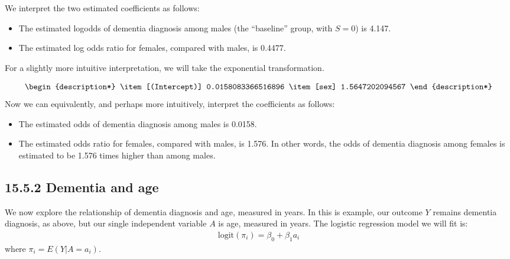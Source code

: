 \documentclass[letterpaper,10pt,english]{jupyterBook}
\begin{document}
\sphinxAtStartPar
We interpret the two estimated coefficients as follows:
\begin{itemize}
\item {} 
\sphinxAtStartPar
The estimated log\sphinxhyphen{}odds of dementia diagnosis among males (the “baseline” group, with \(S=0\)) is \sphinxhyphen{}4.147.

\item {} 
\sphinxAtStartPar
The estimated log odds ratio for females, compared with males, is 0.4477.

\end{itemize}

\sphinxAtStartPar
For a slightly more intuitive interpretation, we will take the exponential transformation.

\begin{sphinxVerbatim}[commandchars=\\\{\}]
\end{sphinxVerbatim}
\begin{equation*}
\begin{split}\begin{description*}
\item[(Intercept)] 0.0158083366516896
\item[sex] 1.5647202094567
\end{description*}\end{split}
\end{equation*}
\sphinxAtStartPar
Now we can equivalently, and perhaps more intuitively, interpret the coefficients as follows:
\begin{itemize}
\item {} 
\sphinxAtStartPar
The estimated odds of dementia diagnosis among males is 0.0158.

\item {} 
\sphinxAtStartPar
The estimated odds ratio for females, compared with males, is 1.576. In other words, the odds of dementia diagnosis among females is estimated to be 1.576 times higher than among males.

\end{itemize}


\subsection{15.5.2 Dementia and age}
\label{\detokenize{15.f. Logistic Regression:dementia-and-age}}
\sphinxAtStartPar
We now explore the relationship of dementia diagnosis and age, measured in years. In this is example, our outcome \(Y\) remains dementia diagnosis, as above, but our single independent variable \(A\) is age, measured in years. The logistic regression model we will fit is:
\begin{equation*}
\begin{split} 
\mathrm{logit}(\pi_i) = \beta_0 + \beta_1 a_i
\end{split}
\end{equation*}
\sphinxAtStartPar
where \(\pi_i=E(Y| A=a_i)\).
\end{document}

